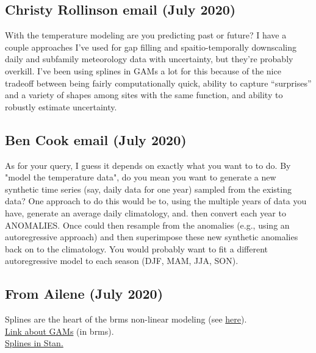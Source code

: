 \documentclass[11pt,letter]{article}
\begin{document}
\subsection{Christy Rollinson email (July 2020)}

With the temperature modeling are you predicting past or future?  I have a couple approaches I’ve used for gap filling and spaitio-temporally downscaling daily and subfamily meteorology data with uncertainty, but they’re probably overkill.  I’ve been using splines in GAMs a lot for this because of the nice tradeoff between being fairly computationally quick, ability to capture ``surprises''  and a variety of shapes among sites with the same function, and ability to robustly estimate uncertainty.\\

\subsection{Ben Cook email (July 2020)}

As for your query, I guess it depends on exactly what you want to to do. By "model the temperature data", do you mean you want to generate a new synthetic time series (say, daily data for one year) sampled from the existing data? One approach to do this would be to, using the multiple years of data you have, generate an average daily climatology, and. then convert each year to ANOMALIES. Once could then resample from the anomalies (e.g., using an autoregressive approach) and then superimpose these new synthetic anomalies back on to the climatology. You would probably want to fit a different autoregressive model to each season (DJF, MAM, JJA, SON). \\

\subsection{From Ailene (July 2020)}

Splines are the heart of the brms non-linear modeling (see \href{https://mran.microsoft.com/snapshot/2017-05-14/web/packages/brms/vignettes/brms_multilevel.pdf}{here}).\\

\href{https://fromthebottomoftheheap.net/2018/04/21/fitting-gams-with-brms/}{Link about GAMs} (in brms).\\

\href{https://github.com/milkha/Splines_in_Stan/blob/master/splines_in_stan.pdf}{Splines in Stan.}\\
\end{document}
